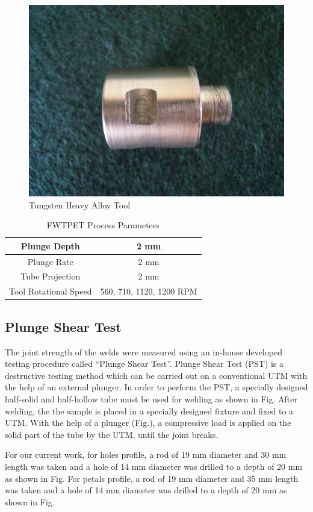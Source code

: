 \documentclass[3p]{elsarticle}
\begin{document}
\begin{figure}[H]
\centering
\includegraphics[width=\textwidth]{images/Tool.jpg}
\caption{Tungsten Heavy Alloy Tool}
\label{fig:backing-block}
\end{figure}

\begin{table}[!htbp]
\caption{FWTPET Process Parameters}
\centering
\begin{tabular}{|c|c|}
\hline 
Plunge Depth & 2 mm \\ 
\hline 
Plunge Rate & 2 mm \\ 
\hline 
Tube Projection & 2 mm \\ 
\hline 
Tool Rotational Speed & 560, 710, 1120, 1200 RPM \\ 
\hline 
\end{tabular} 
\label{table:process-parameters} %
\end{table}

\subsection{Plunge Shear Test}
\label{subsec:Plunge Shear Test}
The joint strength of the welds were measured using an in-house developed testing procedure called ``Plunge Shear Test''. Plunge Shear Test (PST) is a destructive testing method which can be carried out on a conventional UTM with the help of an external plunger. In order to perform the PST, a specially designed half-solid and half-hollow tube must be used for welding as shown in Fig. After welding, the the sample is placed in a specially designed fixture and fixed to a UTM. With the help of a plunger (Fig.), a compressive load is applied on the solid part of the tube by the UTM, until the joint breaks.
\par
For our current work, for holes profile, a rod of 19 mm diameter and 30 mm length was taken and a hole of 14 mm diameter was drilled to a depth of 20 mm as shown in Fig. For petals profile, a rod of 19 mm diameter and 35 mm length was taken and a hole of 14 mm diameter was drilled to a depth of 20 mm as shown in Fig.
\end{document}
